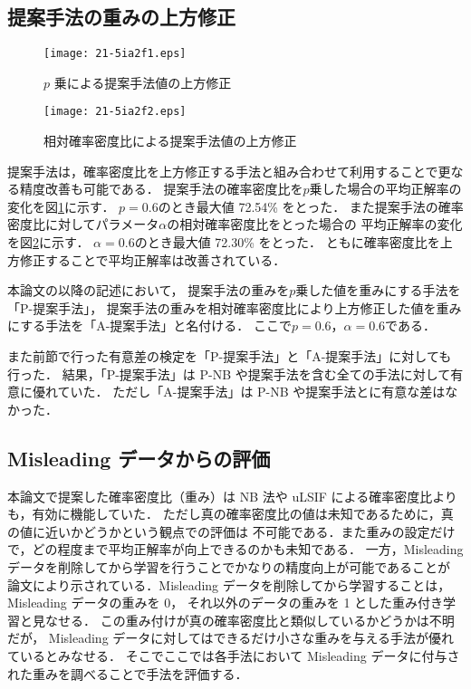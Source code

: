 \documentclass[japanese]{jnlp_1.4}
\begin{document}
\subsection{提案手法の重みの上方修正}

\begin{figure}[b]
\begin{center}
\texttt{[image: 21-5ia2f1.eps]}
\end{center}
\caption{$p$ 乗による提案手法値の上方修正}\label{zu1}
\end{figure} 
\begin{figure}[tb]
\begin{center}
\texttt{[image: 21-5ia2f2.eps]}
\end{center}
\caption{相対確率密度比による提案手法値の上方修正}\label{zu2}
\end{figure} 

提案手法は，確率密度比を上方修正する手法と組み合わせて利用することで更なる精度改善も可能である．
提案手法の確率密度比を$p$乗した場合の平均正解率の変化を\mbox{図\ref{zu1}}に示す．
$p = 0.6$のとき最大値 72.54\% をとった．
また提案手法の確率密度比に対してパラメータ$\alpha$の相対確率密度比をとった場合の
平均正解率の変化を\mbox{図\ref{zu2}}に示す．
$\alpha = 0.6$のとき最大値 72.30\% をとった．
ともに確率密度比を上方修正することで平均正解率は改善されている．

本論文の以降の記述において，
提案手法の重みを$p$乗した値を重みにする手法を「P-提案手法」，
提案手法の重みを相対確率密度比により上方修正した値を重みにする手法を「A-提案手法」と名付ける．
ここで$p = 0.6$，$\alpha = 0.6$である．

また前節で行った有意差の検定を「P-提案手法」と「A-提案手法」に対しても行った．
結果，「P-提案手法」は P-NB や提案手法を含む全ての手法に対して有意に優れていた．
ただし「A-提案手法」は P-NB や提案手法とに有意な差はなかった．


\subsection{Misleading データからの評価}

本論文で提案した確率密度比（重み）は NB 法や uLSIF による確率密度比よりも，有効に機能していた．
ただし真の確率密度比の値は未知であるために，真の値に近いかどうかという観点での評価は
不可能である．また重みの設定だけで，どの程度まで平均正解率が向上できるのかも未知である．
一方，Misleading データを削除してから学習を行うことでかなりの精度向上が可能であることが
論文\cite{yoshida}により示されている．Misleading データを削除してから学習することは，
Misleading データの重みを 0，
それ以外のデータの重みを 1 とした重み付き学習と見なせる．
この重み付けが真の確率密度比と類似しているかどうかは不明だが，
Misleading データに対してはできるだけ小さな重みを与える手法が優れているとみなせる．
そこでここでは各手法において Misleading データに付与された重みを調べることで手法を評価する．
\end{document}
